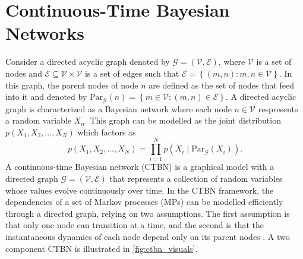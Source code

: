 \section{Continuous-Time Bayesian Networks}
\label{sec:ctbn_intro}
Consider a directed acyclic graph denoted by $ \mathcal{G} = \left( \mathcal{V}, \mathcal{E}\right) $, where $ \mathcal{V} $ is a set of nodes and $ \mathcal{E} \subseteq \mathcal{V} \times \mathcal{V} $ is a set of edges such that $ \mathcal{E} = \left\lbrace \left( m, n\right) : m, n \in \mathcal{V} \right\rbrace $. In this graph, the parent nodes of node $ n $ are defined as the set of nodes that feed into it and denoted by $ \mathrm{Par}_{\mathcal{G}}(n) = \left\lbrace m \in \mathcal{V} : \left( m, n \right) \in \mathcal{E} \right\rbrace $. A directed acyclic graph is characterized as a Bayesian network where each node $ n \in \mathcal{V} $ respresents a random variable $ X_n $. This graph can be modelled as the joint distribution $ p(X_1, X_2, ..., X_N) $ which factors as 
\begin{equation}
p(X_1, X_2, ..., X_N) = \prod_{i=1}^{N} p(X_i \mid \mathrm{Par}_{\mathcal{G}}(X_i)).
\end{equation}
A continuous-time Bayesian network (CTBN) is a graphical model with a directed graph $\mathcal{G} = \left( \mathcal{V}, \mathcal{E}\right) $ that represents a collection of random variables whose values evolve continuously over time. In the CTBN framework, the dependencies of a set of Markov processes (MPs) can be modelled efficiently through a directed graph, relying on two assumptions. The first assumption is that only one node can transition at a time, and the second is that the instantaneous dynamics of each node depend only on its parent nodes \cite{Cohn2010a, Nodelman1995}. A two component CTBN is illustrated in \autoref{fig:ctbn_visuals}.
